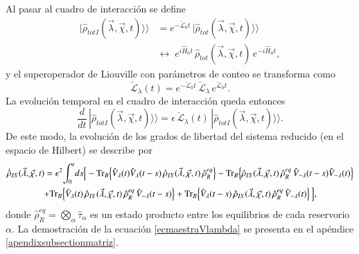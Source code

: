 Al pasar al cuadro de interacción se define
\begin{align*}
    |\hat{\rho}_{totI}(\vec{\lambda},\vec{\chi},t)\rangle\rangle 
    &= e^{-\check{\mathcal{L}}_{0}t}\,|\hat{\rho}_{tot}(\vec{\lambda},\vec{\chi},t)\rangle\rangle \\
    &\longleftrightarrow\;
       e^{i\hat{H}_{0}t}\,\hat{\rho}_{tot}(\vec{\lambda},\vec{\chi},t)\,e^{-i\hat{H}_{0}t},
\end{align*}
y el superoperador de Liouville con parámetros de conteo se transforma como
\begin{equation*}
    \check{\mathcal{L}}_{\lambda}(t)
    = e^{-\check{\mathcal{L}}_{0}t}\,\check{\mathcal{L}}_{\lambda}\,e^{\check{\mathcal{L}}_{0}t}.
\end{equation*}
La evolución temporal en el cuadro de interacción queda entonces
\begin{equation}
    \frac{d}{dt}\,|\hat{\rho}_{totI}(\vec{\lambda},\vec{\chi},t)\rangle\rangle
    = \epsilon\,\check{\mathcal{L}}_{\lambda}(t)\,|\hat{\rho}_{totI}(\vec{\lambda},\vec{\chi},t)\rangle\rangle .
    \label{sec2FCS:evolution}
\end{equation}
De este modo, la evolución de los grados de libertad del sistema reducido (en el espacio de Hilbert) se describe por
\begin{multline}
    \dot{\hat{\rho}}_{IS}(\vec{\lambda},\vec{\chi},t) 
    = \epsilon^{2}\!\int_{0}^{t}\!ds \Big[
      - \textnormal{Tr}_{B}\!\left\{\hat{V}_{\lambda}(t)\hat{V}_{\lambda}(t-s)\,\hat{\rho}_{IS}(\vec{\lambda},\vec{\chi},t)\,\hat{\rho}^{eq}_{R}\right\}
      - \textnormal{Tr}_{B}\!\left\{\hat{\rho}_{IS}(\vec{\lambda},\vec{\chi},t)\,\hat{\rho}^{eq}_{R}\,\hat{V}_{-\lambda}(t-s)\hat{V}_{-\lambda}(t)\right\} \\
      + \textnormal{Tr}_{B}\!\left\{\hat{V}_{\lambda}(t)\,\hat{\rho}_{IS}(\vec{\lambda},\vec{\chi},t)\,\hat{\rho}^{eq}_{R}\,\hat{V}_{-\lambda}(t-s)\right\}
      + \textnormal{Tr}_{B}\!\left\{\hat{V}_{\lambda}(t-s)\,\hat{\rho}_{IS}(\vec{\lambda},\vec{\chi},t)\,\hat{\rho}^{eq}_{R}\,\hat{V}_{-\lambda}(t)\right\}
    \Big],
    \label{ecmaestraVlambda}
\end{multline}
donde \(\hat{\rho}^{eq}_{R}=\bigotimes_{\alpha}\hat{\tau}_{\alpha}\) es un estado producto entre los equilibrios de cada reservorio $\alpha$. La demostración de la ecuación \eqref{ecmaestraVlambda} se presenta en el apéndice \ref{apendixsubsectionmatriz}.
\\


